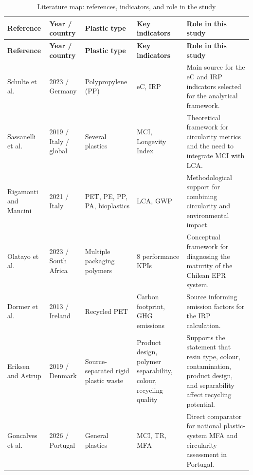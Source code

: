 \documentclass[review,10pt]{elsarticle}
\renewcommand{\arraystretch}{1.12}
\begin{document}
{
\footnotesize
\renewcommand{\arraystretch}{0.75}
\begin{longtable}{|L{2cm}|L{2cm}|L{2.45cm}|L{2.55cm}|L{5cm}|}

\caption{Literature map: references, indicators, and role in the study}
\label{tab:mapa_literatura}\\

\hline
\textbf{Reference} &
\textbf{Year / country} &
\textbf{Plastic type} &
\textbf{Key indicators} &
\textbf{Role in this study} \\
\hline
\endfirsthead

\hline
\textbf{Reference} &
\textbf{Year / country} &
\textbf{Plastic type} &
\textbf{Key indicators} &
\textbf{Role in this study} \\
\hline
\endhead

Schulte et al. & 2023 / Germany & Polypropylene (PP) & eC, IRP &
Main source for the eC and IRP indicators selected for the analytical framework. \\
\hline

Sassanelli et al. & 2019 / Italy / global & Several plastics & MCI, Longevity Index &
Theoretical framework for circularity metrics and the need to integrate MCI with LCA. \\
\hline

Rigamonti and Mancini & 2021 / Italy & PET, PE, PP, PA, bioplastics & LCA, GWP &
Methodological support for combining circularity and environmental impact. \\
\hline

Olatayo et al. & 2023 / South Africa & Multiple packaging polymers & 8 performance KPIs &
Conceptual framework for diagnosing the maturity of the Chilean EPR system. \\
\hline

Dormer et al. & 2013 / Ireland & Recycled PET & Carbon footprint, GHG emissions &
Source informing emission factors for the IRP calculation. \\
\hline

Eriksen and Astrup & 2019 / Denmark & Source-separated rigid plastic waste &
Product design, polymer separability, colour, recycling quality &
Supports the statement that resin type, colour, contamination, product design, and separability affect recycling potential. \\
\hline

Goncalves et al. & 2026 / Portugal & General plastics & MCI, TR, MFA &
Direct comparator for national plastic-system MFA and circularity assessment in Portugal. \\
\hline


\end{longtable}}
\end{document}
